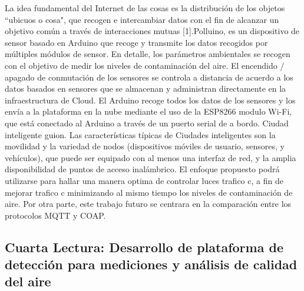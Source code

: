 \documentclass[10pt,a4paper]{article}
\begin{document}
\begin{multicols}{2}
\begin{itemize}
La idea fundamental del Internet de las cosas es la
distribución de los objetos ``ubicuos o cosa", que recogen
e intercambiar datos con el fin de alcanzar un objetivo
común a través de interacciones mutuas [1].Polluino,
es un dispositivo de sensor basado en Arduino
que recoge y transmite los datos recogidos por múltiples
módulos de sensor. En detalle, los parámetros ambientales
se recogen con el objetivo de medir los niveles
de contaminación del aire. El encendido / apagado de
conmutación de los sensores se controla a distancia de
acuerdo a los datos basados en sensores que se almacenan
y administran directamente en la infraestructura
de Cloud. El Arduino recoge todos los datos de los sensores
y los envía a la plataforma en la nube mediante
el uso de la ESP8266 modulo Wi-Fi, que está conectado
al Arduino a través de un puerto serial de a bordo.
Ciudad inteligente guion. Las características típicas de
Ciudades inteligentes son la movilidad y la variedad
de nodos (dispositivos móviles de usuario, sensores, y
vehículos), que puede ser equipado con al menos una
interfaz de red, y la amplia disponibilidad de puntos
de acceso inalámbrico.
El enfoque propuesto podrá utilizarse para hallar una
manera  optima de controlar luces trafico c, a  fin de mejorar
trafico c minimizando al mismo tiempo los niveles
de contaminación de aire. Por otra parte, este trabajo
futuro se centrara en la comparación entre los protocolos
MQTT y COAP.

\subsection{Cuarta Lectura: Desarrollo de plataforma de detección para mediciones y análisis de calidad del aire}


\end{itemize}
\end{multicols}
\end{document}

